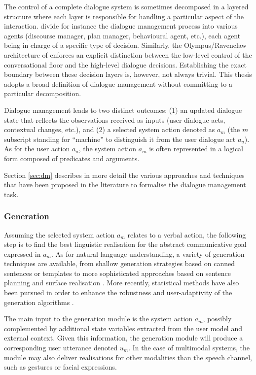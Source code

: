 The control of a complete dialogue system is sometimes decomposed in a layered structure where each layer is responsible for handling a particular aspect of the interaction. \cite{Allen:2000:AGD:973935.973937} divide for instance the dialogue management process into various agents (discourse manager, plan manager, behavioural agent, etc.), each agent being in charge of a specific type of decision. Similarly, the Olympus/Ravenclaw architecture of \cite{Bohus:2009} enforces an explicit distinction between the low-level control of the conversational floor and the high-level dialogue decisions.  Establishing the exact boundary between these decision layers is, however, not always trivial. This thesis adopts a broad definition of dialogue management without committing to a particular decomposition. 

Dialogue management leads to two distinct outcomes: (1) an updated dialogue state that reflects the observations received as inputs (user dialogue acts, contextual changes, etc.), and (2) a selected system action denoted as $a_m$ (the $m$ subscript standing for ``machine'' to distinguish it from the user dialogue act $a_u$).  As for the user action $a_u$, the system action $a_m$ is often represented in a logical form composed of predicates and arguments. 

Section \ref{sec:dm} describes in more detail the various approaches and techniques that have been proposed in the literature to formalise the dialogue management task. 

\subsubsection*{Generation}
Assuming the selected system action $a_m$ relates to a verbal action, the following step is to find the best linguistic realisation for the abstract communicative goal expressed in $a_m$.  As for natural language understanding, a variety of generation techniques are available, from shallow generation strategies based on canned sentences or templates to more sophisticated approaches based on sentence planning and surface realisation \citep{Stone2003,koller-stone:2007}.  More recently, statistical methods have also been pursued in order to enhance the robustness and user-adaptivity of the generation algorithms \citep{Rieser:2010,DethlefsC11}. 

The main input to the generation module is the system action $a_m$, possibly complemented by additional state variables extracted from the user model and external context. Given this information, the generation module will produce a corresponding user utterance denoted $u_m$.  In the case of multimodal systems, the module may also deliver realisations for other modalities than the speech channel, such as gestures or facial expressions.

